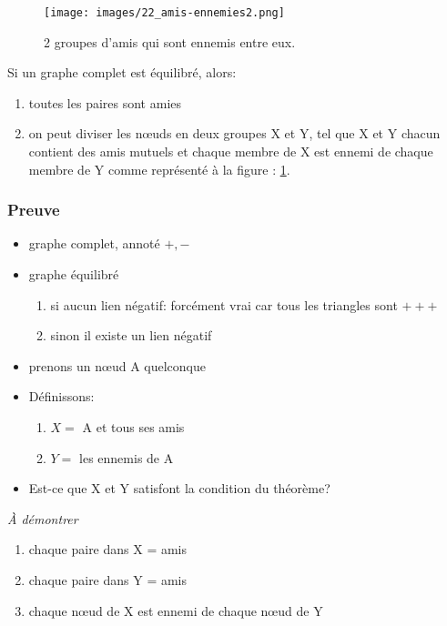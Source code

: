 \begin{figure}[h!]
	\centering
	\texttt{[image: images/22\_amis-ennemies2.png]}
	\label{groupami}
	\caption{2 groupes d'amis qui sont ennemis entre eux.}
\end{figure}

Si un graphe complet est équilibré, alors:

\begin{enumerate}
	\item toutes les paires sont amies
	\item on peut diviser les nœuds en deux groupes X et Y, tel que X et Y chacun contient des amis mutuels et chaque membre de X est ennemi de chaque membre de Y comme représenté à la figure : \ref{groupami}.
\end{enumerate}

\subsubsection*{Preuve}

\begin{itemize}\renewcommand\labelitemi{\textbullet}
	\item graphe complet, annoté $+,-$
	\item graphe équilibré
	
	\begin{enumerate}
		\item si aucun lien négatif: forcément vrai car tous les triangles sont $+++$
		\item sinon il existe un lien négatif
	\end{enumerate}

	\item prenons un nœud A quelconque
	\item Définissons:

	\begin{enumerate}
		\item $X = $ A et tous ses amis
		\item $Y = $ les ennemis de A
	\end{enumerate}

	\item Est-ce que X et Y satisfont la condition du théorème?
\end{itemize}

\textit{À démontrer}

\begin{enumerate}
	\item chaque paire dans X = amis
	\item chaque paire dans Y = amis
	\item chaque nœud de X est ennemi de chaque nœud de Y
\end{enumerate}

